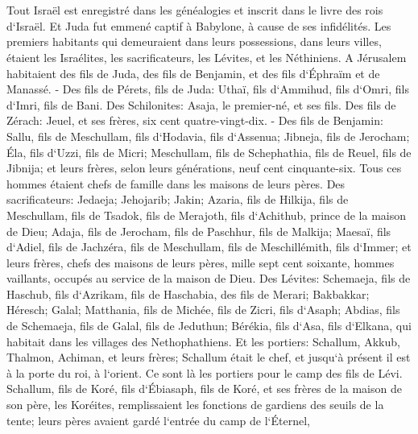 \chapter{}

\verse Tout Israël est enregistré dans les généalogies et inscrit dans le livre des rois d`Israël. Et Juda fut emmené captif à Babylone, à cause de ses infidélités. 
\verse Les premiers habitants qui demeuraient dans leurs possessions, dans leurs villes, étaient les Israélites, les sacrificateurs, les Lévites, et les Néthiniens. 
\verse A Jérusalem habitaient des fils de Juda, des fils de Benjamin, et des fils d`Éphraïm et de Manassé. - 
\verse Des fils de Pérets, fils de Juda: Uthaï, fils d`Ammihud, fils d`Omri, fils d`Imri, fils de Bani. 
\verse Des Schilonites: Asaja, le premier-né, et ses fils. 
\verse Des fils de Zérach: Jeuel, et ses frères, six cent quatre-vingt-dix. - 
\verse Des fils de Benjamin: Sallu, fils de Meschullam, fils d`Hodavia, fils d`Assenua; 
\verse Jibneja, fils de Jerocham; Éla, fils d`Uzzi, fils de Micri; Meschullam, fils de Schephathia, fils de Reuel, fils de Jibnija; 
\verse et leurs frères, selon leurs générations, neuf cent cinquante-six. Tous ces hommes étaient chefs de famille dans les maisons de leurs pères. 
\verse Des sacrificateurs: Jedaeja; Jehojarib; Jakin; 
\verse Azaria, fils de Hilkija, fils de Meschullam, fils de Tsadok, fils de Merajoth, fils d`Achithub, prince de la maison de Dieu; 
\verse Adaja, fils de Jerocham, fils de Paschhur, fils de Malkija; Maesaï, fils d`Adiel, fils de Jachzéra, fils de Meschullam, fils de Meschillémith, fils d`Immer; 
\verse et leurs frères, chefs des maisons de leurs pères, mille sept cent soixante, hommes vaillants, occupés au service de la maison de Dieu. 
\verse Des Lévites: Schemaeja, fils de Haschub, fils d`Azrikam, fils de Haschabia, des fils de Merari; 
\verse Bakbakkar; Héresch; Galal; Matthania, fils de Michée, fils de Zicri, fils d`Asaph; 
\verse Abdias, fils de Schemaeja, fils de Galal, fils de Jeduthun; Bérékia, fils d`Asa, fils d`Elkana, qui habitait dans les villages des Nethophathiens. 
\verse Et les portiers: Schallum, Akkub, Thalmon, Achiman, et leurs frères; Schallum était le chef, 
\verse et jusqu`à présent il est à la porte du roi, à l`orient. Ce sont là les portiers pour le camp des fils de Lévi. 
\verse Schallum, fils de Koré, fils d`Ébiasaph, fils de Koré, et ses frères de la maison de son père, les Koréites, remplissaient les fonctions de gardiens des seuils de la tente; leurs pères avaient gardé l`entrée du camp de l`Éternel, 
